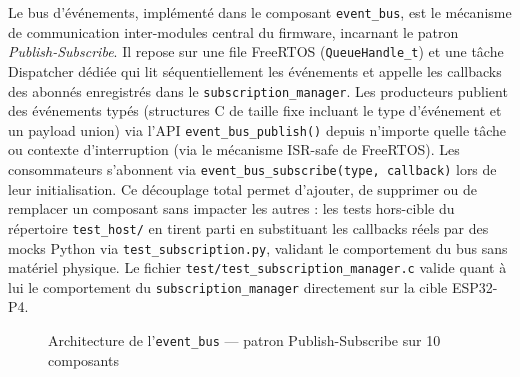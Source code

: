 Le bus d'événements, implémenté dans le composant \texttt{event\_bus},
est le mécanisme de communication inter-modules central du firmware,
incarnant le patron \textit{Publish-Subscribe}. Il repose sur une
file FreeRTOS (\texttt{QueueHandle\_t}) et une tâche Dispatcher
dédiée qui lit séquentiellement les événements et appelle les
callbacks des abonnés enregistrés dans le \texttt{subscription\_manager}.
Les producteurs publient des événements typés (structures C de taille
fixe incluant le type d'événement et un payload union) via l'API
\texttt{event\_bus\_publish()} depuis n'importe quelle tâche ou
contexte d'interruption (via le mécanisme ISR-safe de FreeRTOS).
Les consommateurs s'abonnent via \texttt{event\_bus\_subscribe(type, callback)}
lors de leur initialisation. Ce découplage total permet d'ajouter,
de supprimer ou de remplacer un composant sans impacter les autres :
les tests hors-cible du répertoire \texttt{test\_host/} en tirent
parti en substituant les callbacks réels par des mocks Python via
\texttt{test\_subscription.py}, validant le comportement du bus sans
matériel physique. Le fichier \texttt{test/test\_subscription\_manager.c}
valide quant à lui le comportement du \texttt{subscription\_manager}
directement sur la cible ESP32-P4.
\begin{figure}[H]
    \centering
    \caption{Architecture de l'\texttt{event\_bus} — patron Publish-Subscribe sur 10 composants}
    \label{fig:ann_event_bus}
\end{figure}

